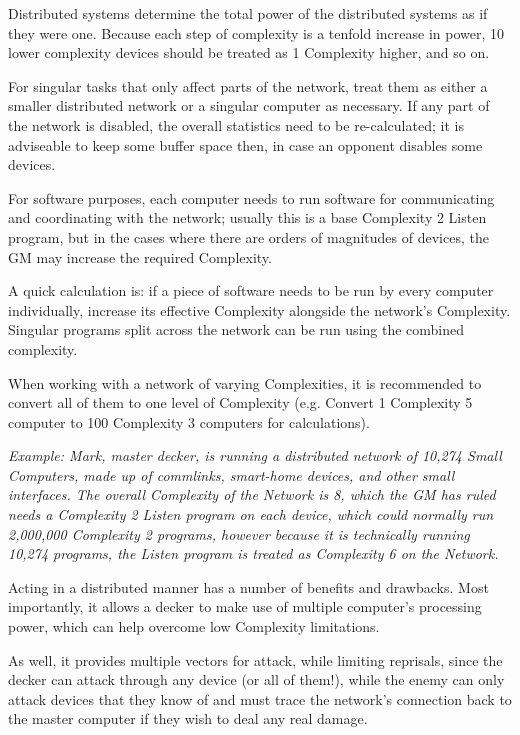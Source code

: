 \begin{multicols}{3}
	Distributed systems determine the total power of the distributed systems as if they were one. Because each step of complexity is a tenfold increase in power, 10 lower complexity devices should be treated as 1 Complexity higher, and so on. 
	
	For singular tasks that only affect parts of the network, treat them as either a smaller distributed network or a singular computer as necessary. If any part of the network is disabled, the overall statistics need to be re-calculated; it is adviseable to keep some buffer space then, in case an opponent disables some devices.
	
	For software purposes, each computer needs to run software for communicating and coordinating with the network; usually this is a base Complexity 2 Listen program, but in the cases where there are orders of magnitudes of devices, the GM may increase the required Complexity.
	
	A quick calculation is: if a piece of software needs to be run by every computer individually, increase its effective Complexity alongside the network's Complexity. Singular programs split across the network can be run using the combined complexity.
	
	When working with a network of varying Complexities, it is recommended to convert all of them to one level of Complexity (e.g. Convert 1 Complexity 5 computer to 100 Complexity 3 computers for calculations).
	
	\textit{\textcolor{OliveGreen}{Example: Mark, master decker, is running a distributed network of 10,274 Small Computers, made up of commlinks, smart-home devices, and other small interfaces. The overall Complexity of the Network is 8, which the GM has ruled needs a Complexity 2 Listen program on each device, which could normally run 2,000,000 Complexity 2 programs, however because it is technically running 10,274 programs, the Listen program is treated as Complexity 6 on the Network.}}
	
	Acting in a distributed manner has a number of benefits and drawbacks. Most importantly, it allows a decker to make use of multiple computer's processing power, which can help overcome low Complexity limitations. 
	
	As well, it provides multiple vectors for attack, while limiting reprisals, since the decker can attack through any device (or all of them!), while the enemy can only attack devices that they know of and must trace the network's connection back to the master computer if they wish to deal any real damage. 
	

\end{multicols}
